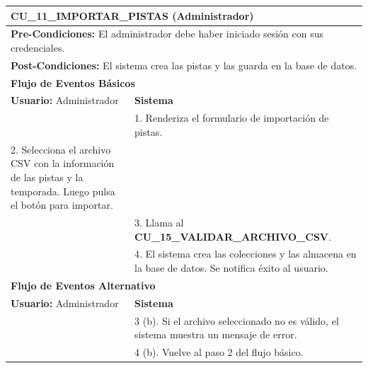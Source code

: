 %
%

\begin{center}
  \begin{tabular}{| p{7.5cm} | p{7.5cm} |}
    \hline
    \multicolumn{2}{|p{15cm}|}{\textbf{CU\_11\_IMPORTAR\_PISTAS} (Administrador)} \\ \hline
    \multicolumn{2}{|p{15cm}|}{\textbf{Pre-Condiciones:} El administrador debe haber iniciado sesión con sus credenciales.} \\ \hline
    \multicolumn{2}{|p{15cm}|}{\textbf{Post-Condiciones:} El sistema crea las pistas y las guarda en la base de datos.} \\ \hline
    \multicolumn{2}{|p{7.5cm}|}{\textbf{Flujo de Eventos Básicos}} \\ \hline
    \multicolumn{1}{|p{7.5cm}|}{\textbf{Usuario:} Administrador} & \multicolumn{1}{|p{7.5cm}|}{\textbf{Sistema}} \\ \hline
    
    \multicolumn{1}{|p{7.5cm}|}{} & 
    \multicolumn{1}{|p{7.5cm}|}{1. Renderiza el formulario de importación de pistas.}\\ \hline
    
    \multicolumn{1}{|p{7.5cm}|}{2. Selecciona el archivo CSV con la información de las pistas y la temporada. Luego pulsa el botón para importar.}& 
    \multicolumn{1}{|p{7.5cm}|}{}\\ \hline
    
    \multicolumn{1}{|p{7.5cm}|}{}& 
    \multicolumn{1}{|p{7.5cm}|}{3. Llama al \textbf{CU\_15\_VALIDAR\_ARCHIVO\_CSV}.}\\ \hline
    
    \multicolumn{1}{|p{7.5cm}|}{} & 
    \multicolumn{1}{|p{7.5cm}|}{4. El sistema crea las colecciones y las almacena en la base de datos. Se notifica éxito al usuario.}\\ \hline
    
    \multicolumn{2}{|p{7.5cm}|}{\textbf{Flujo de Eventos Alternativo}} \\ \hline
    
    \multicolumn{1}{|p{7.5cm}|}{\textbf{Usuario:} Administrador} & \multicolumn{1}{|p{7.5cm}|}{\textbf{Sistema}} \\ \hline
    
    \multicolumn{1}{|p{7.5cm}|}{} & 
    \multicolumn{1}{|p{7.5cm}|}{3 (b). Si el archivo seleccionado no es válido, el sistema muestra un mensaje de error.}\\ \hline
    
    \multicolumn{1}{|p{7.5cm}|}{} & 
    \multicolumn{1}{|p{7.5cm}|}{4 (b). Vuelve al paso 2 del flujo básico.}\\ \hline
  \end{tabular}
  
  \label{table:usecase:11}
\end{center}


